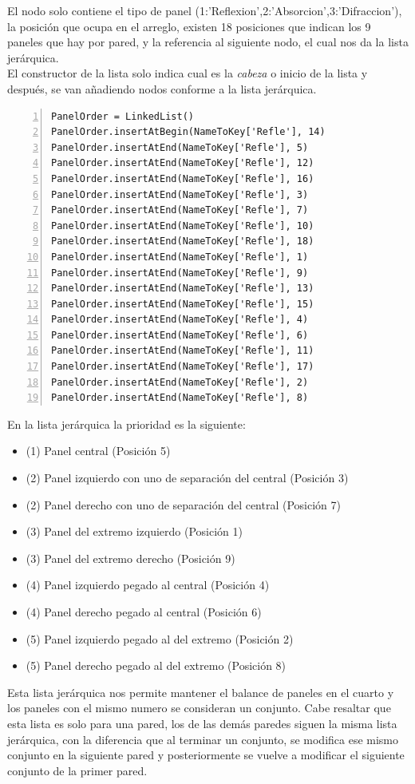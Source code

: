 El nodo solo contiene el tipo de panel (1:'Reflexion',2:'Absorcion',3:'Difraccion'), la posición que ocupa en el arreglo, existen 18 posiciones que indican los 9 paneles que hay por pared, y la referencia al siguiente nodo, el cual nos da la lista jerárquica. \\
El constructor de la lista solo indica cual es la \textit{cabeza} o inicio de la lista y después, se van añadiendo nodos conforme a la lista jerárquica.
\begin{lstlisting}[frame=single,numbers=left, style=matlab-editor, basicstyle=\tiny]
PanelOrder = LinkedList() 
PanelOrder.insertAtBegin(NameToKey['Refle'], 14)
PanelOrder.insertAtEnd(NameToKey['Refle'], 5)
PanelOrder.insertAtEnd(NameToKey['Refle'], 12)
PanelOrder.insertAtEnd(NameToKey['Refle'], 16)
PanelOrder.insertAtEnd(NameToKey['Refle'], 3)
PanelOrder.insertAtEnd(NameToKey['Refle'], 7)
PanelOrder.insertAtEnd(NameToKey['Refle'], 10)
PanelOrder.insertAtEnd(NameToKey['Refle'], 18)
PanelOrder.insertAtEnd(NameToKey['Refle'], 1)
PanelOrder.insertAtEnd(NameToKey['Refle'], 9)
PanelOrder.insertAtEnd(NameToKey['Refle'], 13)
PanelOrder.insertAtEnd(NameToKey['Refle'], 15)
PanelOrder.insertAtEnd(NameToKey['Refle'], 4)
PanelOrder.insertAtEnd(NameToKey['Refle'], 6)
PanelOrder.insertAtEnd(NameToKey['Refle'], 11)
PanelOrder.insertAtEnd(NameToKey['Refle'], 17)
PanelOrder.insertAtEnd(NameToKey['Refle'], 2)
PanelOrder.insertAtEnd(NameToKey['Refle'], 8)
\end{lstlisting}
En la lista jerárquica la prioridad es la siguiente:
\begin{itemize}
    \item (1) Panel central (Posición 5)
    \item (2) Panel izquierdo con uno de separación del central (Posición 3)
    \item (2) Panel derecho con uno de separación del central (Posición 7)
    \item (3) Panel del extremo izquierdo (Posición 1)
    \item (3) Panel del extremo derecho (Posición 9)
    \item (4) Panel izquierdo pegado al central (Posición 4)
    \item (4) Panel derecho pegado al central (Posición 6)
    \item (5) Panel izquierdo pegado al del extremo (Posición 2)
    \item (5) Panel derecho pegado al del extremo (Posición 8)
\end{itemize}
Esta lista jerárquica nos permite mantener el balance de paneles en el cuarto y los paneles con el mismo numero se consideran un conjunto. Cabe resaltar que esta lista es solo para una pared, los de las demás paredes siguen la misma lista jerárquica, con la diferencia que al terminar un conjunto, se modifica ese mismo conjunto en la siguiente pared y posteriormente se vuelve a modificar el siguiente conjunto de la primer pared.
